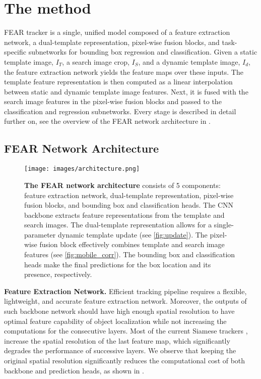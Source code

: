 \documentclass[runningheads]{llncs}
\begin{document}
\section{The method}

FEAR tracker is a single, unified model composed of a feature extraction network, a dual-template representation, pixel-wise fusion blocks, and task-specific subnetworks for bounding box regression and classification. 
Given a static template image, $I_T$, a search image crop, $I_S$, and a dynamic template image, $I_{d}$, the feature extraction network yields the feature maps over these inputs.
The template feature representation is then computed as a linear interpolation between static and dynamic template image features. 
Next, it is fused with the search image features in the pixel-wise fusion blocks and passed to the classification and regression subnetworks. 
Every stage is described in detail further on, see the overview of the FEAR network architecture in .

\subsection{FEAR Network Architecture}



\begin{figure*}[t!]\texttt{[image: images/architecture.png]}
\caption{\textbf{The FEAR network architecture} consists of 5 components: feature extraction network, dual-template representation, pixel-wise fusion blocks, and bounding box and classification heads. 
  The CNN backbone extracts feature representations from the template and search images. 
  The dual-template representation allows for a single-parameter dynamic template update (see \cref{fig:update}).
  The pixel-wise fusion block effectively combines template and search image features (see \cref{fig:mobile_corr}). 
  The bounding box and classification heads make the final predictions for the box location and its presence, respectively.}
\label{fig:arch}
\end{figure*}

\textbf{Feature Extraction Network.} Efficient tracking pipeline requires a flexible, lightweight, and accurate feature extraction network. 
Moreover, the outputs of such backbone network should have high enough spatial resolution to have optimal feature capability of object localization \cite{SiamRPN++} while not increasing the computations for the consecutive layers. 
Most of the current Siamese trackers \cite{Ocean}, \cite{SiamRPN++} increase the spatial resolution of the last feature map, which significantly degrades the performance of successive layers. 
We observe that keeping the original spatial resolution significantly reduces the computational cost of both backbone and prediction heads, as shown in .
\end{document}
